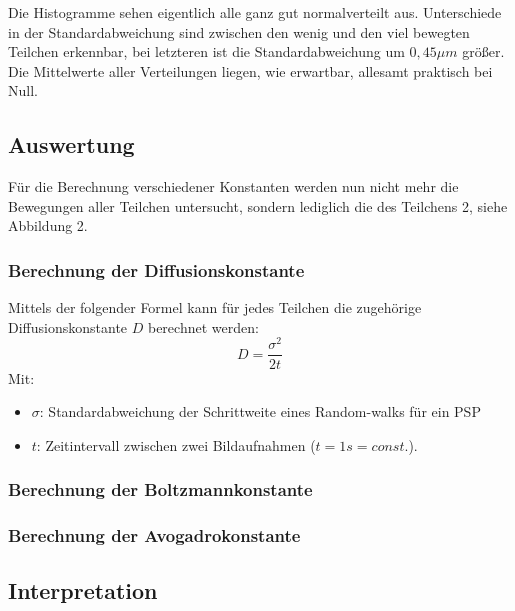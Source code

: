 \documentclass[
  9pt,
]{article}
\begin{document}
Die Histogramme sehen eigentlich alle ganz gut normalverteilt aus.
Unterschiede in der Standardabweichung sind zwischen den wenig und den
viel bewegten Teilchen erkennbar, bei letzteren ist die
Standardabweichung um \(0,45\mu m\) größer. Die Mittelwerte aller
Verteilungen liegen, wie erwartbar, allesamt praktisch bei Null.

\hypertarget{auswertung}{%
\subsection{Auswertung}\label{auswertung}}

Für die Berechnung verschiedener Konstanten werden nun nicht mehr die
Bewegungen aller Teilchen untersucht, sondern lediglich die des
Teilchens 2, siehe Abbildung 2.

\hypertarget{berechnung-der-diffusionskonstante}{%
\subsubsection{Berechnung der
Diffusionskonstante}\label{berechnung-der-diffusionskonstante}}

Mittels der folgender Formel kann für jedes Teilchen die zugehörige
Diffusionskonstante \(D\) berechnet werden: \[D=\frac{\sigma^2}{2t}\]
Mit:

\begin{itemize}
\item $\sigma$: Standardabweichung der Schrittweite eines Random-walks für ein PSP
\item $t$: Zeitintervall zwischen zwei Bildaufnahmen ($t=1s=const.$).
\end{itemize}

\hypertarget{berechnung-der-boltzmannkonstante}{%
\subsubsection{Berechnung der
Boltzmannkonstante}\label{berechnung-der-boltzmannkonstante}}

\hypertarget{berechnung-der-avogadrokonstante}{%
\subsubsection{Berechnung der
Avogadrokonstante}\label{berechnung-der-avogadrokonstante}}

\hypertarget{interpretation}{%
\subsection{Interpretation}\label{interpretation}}
\end{document}
